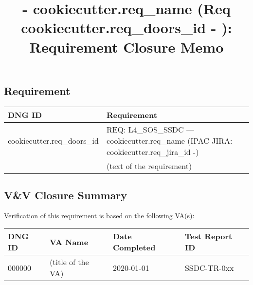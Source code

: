 \documentclass[TR]{spherex}
\title{ {{- cookiecutter.req_name }} (Req {{ cookiecutter.req_doors_id -}} ): Requirement Closure Memo}
\begin{document}
\maketitlecompact

\begin{dochistory}
\end{dochistory}

\begin{small}

\subsection*{Requirement}

\begin{longtable}{|l|p{}|}
\hline
\textbf{DNG ID} & \textbf{Requirement} \\
\endhead
\hline
{{ cookiecutter.req_doors_id }} & REQ: L4\_SOS\_SSDC --- {{ cookiecutter.req_name }} (IPAC JIRA: {{ cookiecutter.req_jira_id -}}) \\
 & (text of the requirement) \\
\hline
\end{longtable}


\subsection*{V\&V Closure Summary}

Verification of this requirement is based on the following VA(s):

\begin{longtable}{|l|l|l|l|}
\hline
\textbf{DNG ID} & \textbf{VA Name} & \textbf{Date Completed} & \textbf{Test Report ID} \\
\endhead
\hline
000000 & (title of the VA) & 2020-01-01 & SSDC-TR-0xx \\
\hline
\end{longtable}




\end{small}
\end{document}
